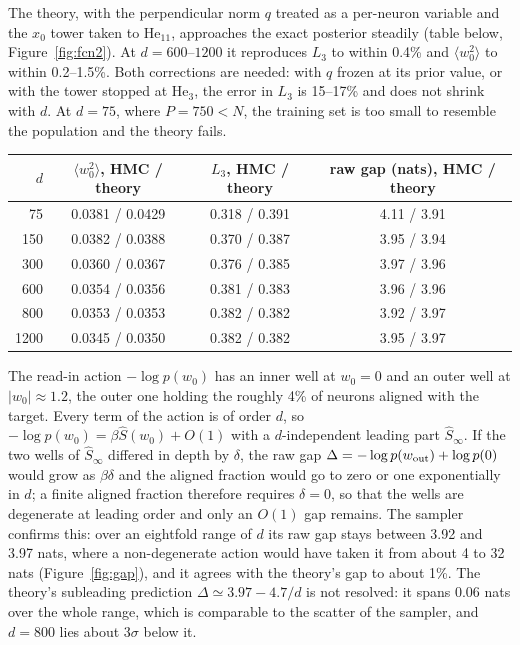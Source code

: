 \documentclass[11pt,a4paper]{article}
\begin{document}
The theory, with the perpendicular norm $q$ treated as a per-neuron variable and the $x_0$
tower taken to He$_{11}$, approaches the exact posterior steadily (table below, Figure~\ref{fig:fcn2}). At $d=600$--$1200$
it reproduces $L_3$ to within 0.4\% and $\langle w_0^2\rangle$ to within 0.2--1.5\%. Both corrections are needed: with $q$
frozen at its prior value, or with the tower stopped at He$_3$, the error in $L_3$ is 15--17\% and does not shrink with
$d$. At $d=75$, where $P=750<N$, the training set is too small to resemble the population and the theory fails.
\begin{center}
\begin{tabular}{@{}rccc@{}}
\toprule
$d$ & $\langle w_0^2\rangle$, HMC / theory & $L_3$, HMC / theory & raw gap (nats), HMC / theory\\
\midrule
75   & 0.0381 / 0.0429 & 0.318 / 0.391 & 4.11 / 3.91\\
150  & 0.0382 / 0.0388 & 0.370 / 0.387 & 3.95 / 3.94\\
300  & 0.0360 / 0.0367 & 0.376 / 0.385 & 3.97 / 3.96\\
600  & 0.0354 / 0.0356 & 0.381 / 0.383 & 3.96 / 3.96\\
800  & 0.0353 / 0.0353 & 0.382 / 0.382 & 3.92 / 3.97\\
1200 & 0.0345 / 0.0350 & 0.382 / 0.382 & 3.95 / 3.97\\
\bottomrule
\end{tabular}
\end{center}

The read-in action $-\log p(w_0)$ has an inner well at $w_0=0$ and an outer well at $|w_0|\approx1.2$, the outer one
holding the roughly 4\% of neurons aligned with the target. Every term of the action is of order $d$, so
$-\log p(w_0)=\beta\hat S(w_0)+O(1)$ with a $d$-independent leading part $\hat S_\infty$. If the two wells of
$\hat S_\infty$ differed in depth by $\delta$, the raw gap $\Delta=-\log p(w_{\rm out})+\log p(0)$ would grow as $\beta\delta$
and the aligned fraction would go to zero or one exponentially in $d$; a finite aligned fraction therefore requires
$\delta=0$, so that the wells are degenerate at leading order and only an $O(1)$ gap remains. The sampler confirms this:
over an eightfold range of $d$ its raw gap stays between 3.92 and 3.97 nats, where a non-degenerate action would have
taken it from about 4 to 32 nats (Figure~\ref{fig:gap}), and it agrees with the theory's gap to about 1\%. The
theory's subleading prediction $\Delta\simeq3.97-4.7/d$ is not resolved: it spans 0.06 nats over the whole range, which
is comparable to the scatter of the sampler, and $d=800$ lies about $3\sigma$ below it.
\end{document}
